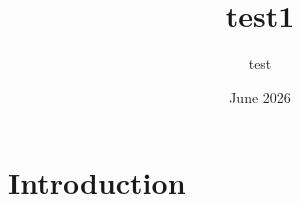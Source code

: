 \documentclass{article}
\title{test1}
\author{test }
\date{June 2026}
\begin{document}
\maketitle

\section{Introduction}
\end{document}
